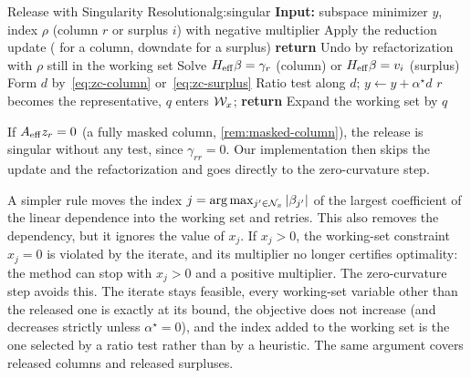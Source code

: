 \begin{algobox}{Release with Singularity Resolution}{alg:singular}
\State \textbf{Input:} subspace minimizer $y$, index $\rho$ (column $r$ or surplus $i$) with
       negative multiplier
\Loop
    \State Apply the reduction update ( for a column, downdate for a surplus)
        \State \textbf{return} 
    \EndIf
    \State Undo by refactorization with $\rho$ still in the working set
    \State Solve $H_{\mathrm{eff}}\beta = \gamma_r$ (column) or $H_{\mathrm{eff}}\beta = v_i$ (surplus)
    \State Form $d$ by~\eqref{eq:zc-column} or~\eqref{eq:zc-surplus}
    \State Ratio test along $d$; $y\gets y+\alpha^\star d$ 
        \State $r$ becomes the representative, $q$ enters $\mathcal{W}_x$; \textbf{return}
    \EndIf
    \State Expand the working set by $q$ 
\EndLoop
\end{algobox}

If $A_{\mathrm{eff}} z_r = 0$ (a fully masked column, \cref{rem:masked-column}), the release is singular
without any test, since $\gamma_{rr} = 0$. Our implementation then skips the update and the
refactorization and goes directly to the zero-curvature step.

\begin{remark} \label{rem:argmax}
A simpler rule moves the index $j = \arg\max_{j'\in\mathcal{N}_x}|\beta_{j'}|$ of the largest coefficient of
the linear dependence into the working set and retries. This also removes the dependency, but
it ignores the value of $x_j$. If $x_j>0$, the working-set constraint $x_j = 0$ is violated by
the iterate, and its multiplier no longer certifies optimality: the method can stop with
$x_j>0$ and a positive multiplier. The zero-curvature step avoids this. The iterate stays
feasible, every working-set variable other than the released one is exactly at its bound, the
objective does not increase (and decreases strictly unless $\alpha^\star = 0$), and the index
added to the working set is the one selected by a ratio test rather
than by a heuristic. The same argument covers released columns and released surpluses.
\end{remark}
